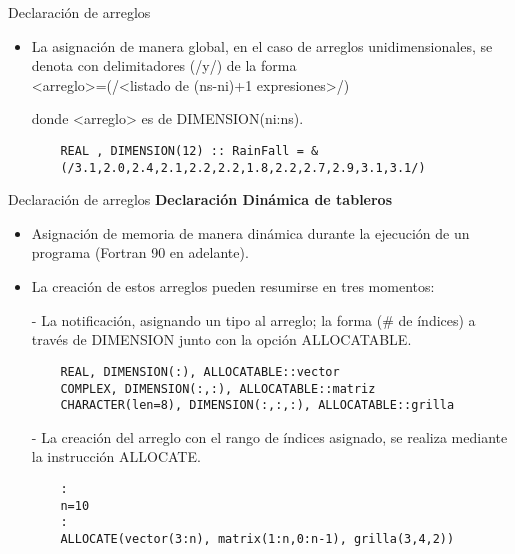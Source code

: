 \begin{frame}[fragile]{Declaración de arreglos}
 \begin{itemize}[<+(0)->]
  \item La asignación de manera global, en el caso de arreglos unidimensionales, se denota con delimitadores (/y/) de la forma \\ 
  \centering <arreglo>=(/<listado de (ns-ni)+1 expresiones>/) \\ 
  \item [] donde <arreglo> es de DIMENSION(ni:ns).
  \vspace{0.15 cm}
  \item []
  \begin{verbatim}
    REAL , DIMENSION(12) :: RainFall = &
    (/3.1,2.0,2.4,2.1,2.2,2.2,1.8,2.2,2.7,2.9,3.1,3.1/)
  \end{verbatim}
 \end{itemize}
\end{frame} 


\begin{frame}[fragile]{Declaración de arreglos}
\textbf{Declaración Dinámica de tableros}
 \begin{itemize}[<+(1)->]
  \item Asignación de memoria de manera dinámica durante la ejecución de un programa (Fortran 90 en adelante).
  \item La creación de estos arreglos pueden resumirse en tres momentos: 
  \item [-] La notificación, asignando un tipo al arreglo; la forma (\# de índices) a través de DIMENSION junto con la opción ALLOCATABLE.
  \vspace{0.15 cm}
  \item []
    \begin{verbatim}
    REAL, DIMENSION(:), ALLOCATABLE::vector
    COMPLEX, DIMENSION(:,:), ALLOCATABLE::matriz
    CHARACTER(len=8), DIMENSION(:,:,:), ALLOCATABLE::grilla
    \end{verbatim}
  \item [-] La creación del arreglo con el rango de índices asignado, se realiza mediante la instrucción ALLOCATE.
  \vspace{0.15 cm}
  \item [] 
    \begin{verbatim}
    :
    n=10
    :
    ALLOCATE(vector(3:n), matrix(1:n,0:n-1), grilla(3,4,2))
    \end{verbatim}
 \end{itemize}
\end{frame}



